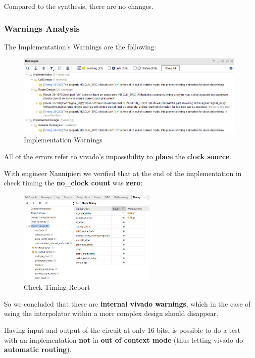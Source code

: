 Compared to the synthesis, there are no changes.

\subsubsection{Warnings Analysis}

The Implementation's Warnings are the following:

\begin{figure}[H]
    \centering
    \includegraphics[width=1\textwidth]{img/Chapter5/ImplementationWarning.png}
    \caption{Implementation Warnings}
    \label{fig:IW}
\end{figure}

All of the errors refer to vivado's impossibility to \textbf{place} the \textbf{clock source}. 


With engineer Nannipieri we verified that at the end of the implementation in check timing the \textbf{no\_clock count} was \textbf{zero}:

\begin{figure}[H]
    \centering
    \includegraphics[width=0.6\textwidth]{img/Chapter5/NoClockCheck.png}
    \caption{Check Timing Report}
    \label{fig:NCC}
\end{figure}

So we concluded that these are \textbf{internal vivado warnings}, which in the case of using the interpolator within a more complex design should disappear.

Having input and output of the circuit at only 16 bits, is possible to do a test with an implementation \textbf{not} in \textbf{out of context mode} (thus letting vivado do \textbf{automatic routing}).

